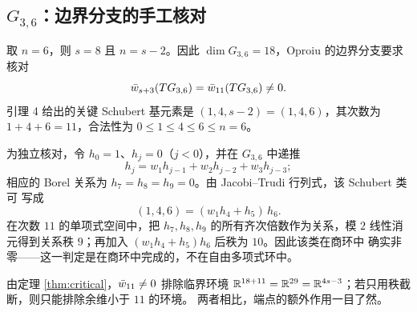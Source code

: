 \subsection{$G_{3,6}$：边界分支的手工核对}
\label{sec:G36}

取 $n=6$，则 $s=8$ 且 $n=s-2$。因此 $\dim G_{3,6}=18$，Oproiu 的边界分支要求
核对
\begin{equation*}
  \bar w_{s+3}(TG_{3,6})=\bar w_{11}(TG_{3,6})\neq0 .
\end{equation*}
引理 4 给出的关键 Schubert 基元素是 $(1,4,s-2)=(1,4,6)$，其次数为
$1+4+6=11$，合法性为 $0\le1\le4\le6\le n=6$。

为独立核对，令 $h_0=1$、$h_j=0$（$j<0$），并在 $G_{3,6}$ 中递推
\begin{equation*}
  h_j=w_1h_{j-1}+w_2h_{j-2}+w_3h_{j-3};
\end{equation*}
相应的 Borel 关系为 $h_7=h_8=h_9=0$。由 Jacobi--Trudi 行列式，该 Schubert 类可
写成
\begin{equation*}
  (1,4,6)=(w_1h_4+h_5)\,h_6 .
\end{equation*}
在次数 $11$ 的单项式空间中，把 $h_7,h_8,h_9$ 的所有齐次倍数作为关系，模 $2$
线性消元得到关系秩 $9$；再加入 $(w_1h_4+h_5)h_6$ 后秩为 $10$。因此该类在商环中
确实非零——这一判定是在商环中完成的，不在自由多项式环中。

由定理 \ref{thm:critical}，$\bar w_{11}\neq0$ 排除临界环境
$\mathbb{R}^{18+11}=\mathbb{R}^{29}=\mathbb{R}^{4s-3}$；若只用秩截断，则只能排除余维小于 $11$ 的环境。
两者相比，端点的额外作用一目了然。
